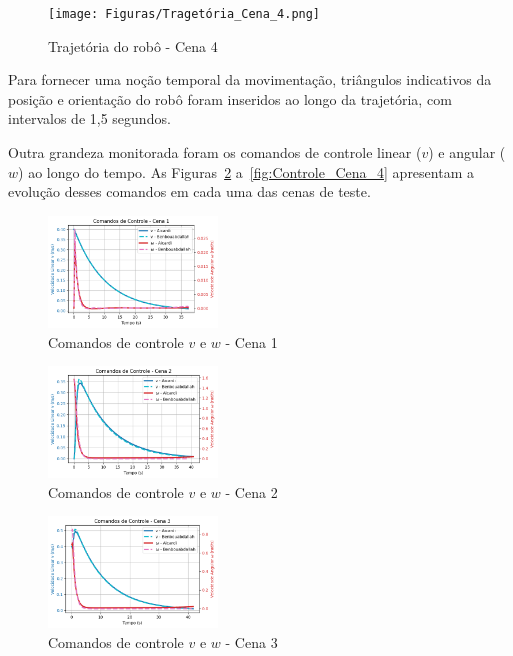 \documentclass[conference]{IEEEtran}
\begin{document}
\begin{figure}[h!]
    \centering
    \texttt{[image: Figuras/Tragetória\_Cena\_4.png]}
    \caption{Trajetória do robô - Cena 4}
    \label{fig:Tragetória_Cena_4}
\end{figure}

Para fornecer uma noção temporal da movimentação, triângulos indicativos da posição e orientação do robô foram inseridos ao longo da trajetória, com intervalos de 1,5 segundos.

Outra grandeza monitorada foram os comandos de controle linear ($v$) e angular ($w$) ao longo do tempo. As Figuras~\ref{fig:Controle_Cena_1} a~\ref{fig:Controle_Cena_4} apresentam a evolução desses comandos em cada uma das cenas de teste.

\begin{figure}[h!]
    \centering
    \includegraphics[width=0.4\textwidth]{Figuras/Controle_Cena_1.png}
    \caption{Comandos de controle $v$ e $w$ - Cena 1}
    \label{fig:Controle_Cena_1}
\end{figure}

\begin{figure}[h!]
    \centering
    \includegraphics[width=0.4\textwidth]{Figuras/Controle_Cena_2.png}
    \caption{Comandos de controle $v$ e $w$ - Cena 2}
    \label{fig:Controle_Cena_2}
\end{figure}

\begin{figure}[h!]
    \centering
    \includegraphics[width=0.4\textwidth]{Figuras/Controle_Cena_3.png}
    \caption{Comandos de controle $v$ e $w$ - Cena 3}
    \label{fig:Controle_Cena_3}
\end{figure}
\end{document}
